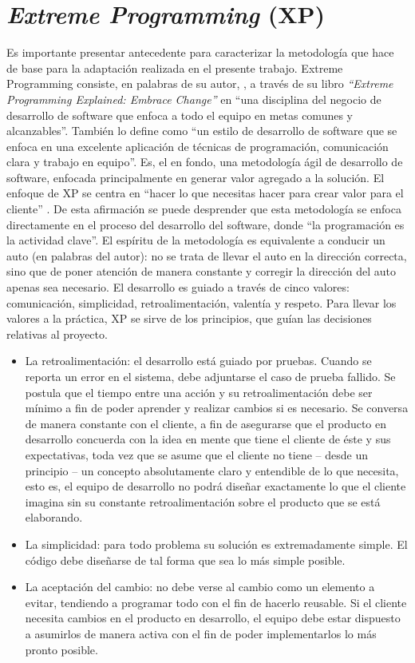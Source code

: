\section{\textit{Extreme Programming} (XP)}
\label{preliminares:xp}

Es importante presentar antecedente para caracterizar la metodología que hace de base para la adaptación realizada en el presente trabajo. Extreme Programming consiste, en palabras de su autor, \cite{Beck1999}, a través de su libro \textit{``Extreme Programming Explained: Embrace Change''} en ``una disciplina del negocio de desarrollo de software que enfoca a todo el equipo en metas comunes y alcanzables''. También lo define como ``un estilo de desarrollo de software que se enfoca en una excelente aplicación de técnicas de programación, comunicación clara y trabajo en equipo''. Es, el en fondo, una metodología ágil de desarrollo de software, enfocada principalmente en generar valor agregado a la solución.
El enfoque de XP se centra en ``hacer lo que necesitas hacer para crear valor para el cliente'' \citep{Beck1999}. De esta afirmación se puede desprender que esta metodología se enfoca directamente en el proceso del desarrollo del software, donde ``la programación es la actividad clave''. El espíritu de la metodología es equivalente a conducir un auto (en palabras del autor): no se trata de llevar el auto en la dirección correcta, sino que de poner atención de manera constante y corregir la dirección del auto apenas sea necesario. El desarrollo es guiado a través de cinco valores: comunicación, simplicidad, retroalimentación, valentía y respeto. Para llevar los valores a la práctica, XP se sirve de los principios, que guían las decisiones relativas al proyecto.
\begin{itemize}
\item La retroalimentación: el desarrollo está guiado por pruebas. Cuando se reporta un error en el sistema, debe adjuntarse el caso de prueba fallido. Se postula que el tiempo entre una acción y su retroalimentación debe ser mínimo a fin de poder aprender y realizar cambios si es necesario. Se conversa de manera constante con el cliente, a fin de asegurarse que el producto en desarrollo concuerda con la idea en mente que tiene el cliente de éste y sus expectativas, toda vez que se asume que el cliente no tiene – desde un principio – un concepto absolutamente claro y entendible de lo que necesita, esto es, el equipo de desarrollo no podrá diseñar exactamente lo que el cliente imagina sin su constante retroalimentación sobre el producto que se está elaborando.
\item La simplicidad: para todo problema su solución es extremadamente simple. El código debe diseñarse de tal forma que sea lo más simple posible.
\item La aceptación del cambio: no debe verse al cambio como un elemento a evitar, tendiendo a programar todo con el fin de hacerlo reusable. Si el cliente necesita cambios en el producto en desarrollo, el equipo debe estar dispuesto a asumirlos de manera activa con el fin de poder implementarlos lo más pronto posible.
\end{itemize}
 
